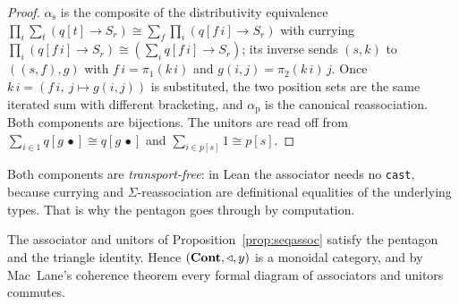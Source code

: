 \begin{proof}
$\alpha_{\mathrm s}$ is the composite of the distributivity equivalence
$\prod_i\sum_{t}(q[t]\to S_r)\cong\sum_f\prod_i(q[f\,i]\to S_r)$ with currying
$\prod_i(q[f\,i]\to S_r)\cong(\sum_i q[f\,i]\to S_r)$; its inverse sends $(s,k)$
to $((s,f),g)$ with $f\,i=\pi_1(k\,i)$ and $g(i,j)=\pi_2(k\,i)\,j$. Once
$k\,i=(f\,i,\ j\mapsto g(i,j))$ is substituted, the two position sets are the
same iterated sum with different bracketing, and $\alpha_{\mathrm p}$ is the
canonical reassociation. Both components are bijections. The unitors are read
off from $\sum_{i\in 1}q[g\,\bullet]\cong q[g\,\bullet]$ and
$\sum_{i\in p[s]}1\cong p[s]$.
\end{proof}

Both components are \emph{transport-free}: in Lean the associator needs no
\texttt{cast}, because currying and $\Sigma$-reassociation are definitional
equalities of the underlying types. That is why the pentagon goes through by
computation.

\begin{Theorem}\label{thm:pentagon}
The associator and unitors of Proposition~\ref{prop:seqassoc} satisfy the
pentagon and the triangle identity. Hence $(\mathbf{Cont},\mathbin{\triangleleft},y)$ is a monoidal
category, and by Mac~Lane's coherence theorem \cite{MacLane} every formal diagram of
associators and unitors commutes.
\end{Theorem}

